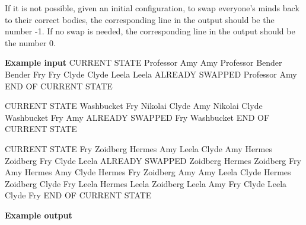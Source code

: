 \normalfont\documentclass[letterpaper,11pt]{article}
\begin{document}
If it is not possible, given an initial configuration, to swap everyone's minds back to their correct bodies, the corresponding line in the output should be the number -1. If no swap is needed, the corresponding line in the output should be the number 0.

\textbf{Example input} \newline
CURRENT STATE \newline
Professor Amy \newline
Amy Professor \newline
Bender Bender \newline
Fry Fry \newline
Clyde Clyde \newline
Leela Leela \newline
ALREADY SWAPPED \newline
Professor Amy \newline
END OF CURRENT STATE

CURRENT STATE \newline
Washbucket Fry \newline
Nikolai Clyde \newline
Amy Nikolai \newline
Clyde Washbucket \newline
Fry Amy \newline
ALREADY SWAPPED \newline
Fry Washbucket \newline
END OF CURRENT STATE

CURRENT STATE \newline
Fry Zoidberg \newline
Hermes Amy \newline
Leela Clyde \newline
Amy Hermes \newline
Zoidberg Fry \newline
Clyde Leela \newline
ALREADY SWAPPED \newline
Zoidberg Hermes \newline
Zoidberg Fry \newline
Amy Hermes \newline
Amy Clyde \newline
Hermes Fry \newline
Zoidberg Amy \newline
Amy Leela \newline
Clyde Hermes \newline
Zoidberg Clyde \newline
Fry Leela \newline
Hermes Leela \newline
Zoidberg Leela \newline
Amy Fry \newline
Clyde Leela \newline
Clyde Fry \newline
END OF CURRENT STATE \newline

\textbf{Example output}   

\newpage
\end{document}

